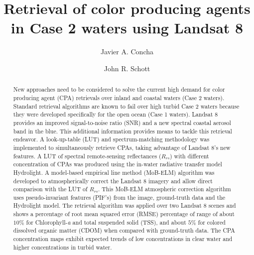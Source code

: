 \documentclass[onecolumn,3p,letterpaper]{elsarticle}
\begin{document}
\begin{frontmatter}

\title{Retrieval of color producing agents in Case 2 waters using Landsat 8}


\author[mymainaddress]{Javier A. Concha}

\author[mymainaddress]{John R. Schott}
\address[mymainaddress]{Rochester Institute of Technology (RIT), NY 14623, USA}
\begin{abstract}

New approaches need to be considered to solve the current high demand for color producing agent (CPA) retrievals over inland and coastal waters (Case 2 waters). 
%
Standard retrieval algorithms are known to fail over high turbid Case 2 waters because they were developed specifically for the open ocean (Case 1 waters). 
%
Landsat 8 provides an improved signal-to-noise ratio (SNR) and a new spectral coastal aerosol band in the blue. 
%
This additional information provides means to tackle this retrieval endeavor. 
A look-up-table (LUT) and spectrum-matching methodology was implemented to simultaneously retrieve CPAs, taking advantage of Landsat 8's new features. 
%
A LUT of spectral remote-sensing reflectances ($R_{rs}$) with different concentration of CPAs was produced using the in-water radiative transfer model Hydrolight. 
%
A model-based empirical line method (MoB-ELM) algorithm was developed to atmospherically correct the Landsat 8 imagery and allow direct comparison with the LUT of $R_{rs}$. 
%
This MoB-ELM atmospheric correction algorithm uses pseudo-invariant features (PIF's) from the image, ground-truth data and the Hydrolight model.
The retrieval algorithm was applied over two Landsat 8 scenes and shows a percentage of root mean squared error (RMSE) percentage of range of about $10\%$ for Chlorophyll-{\it a} and total suspended solid (TSS), and about $5\%$ for colored dissolved organic matter (CDOM) when compared with ground-truth data. The CPA concentration maps exhibit expected trends of low concentrations in clear water and higher concentrations in turbid water.


\end{abstract}
\end{frontmatter}
\end{document}
